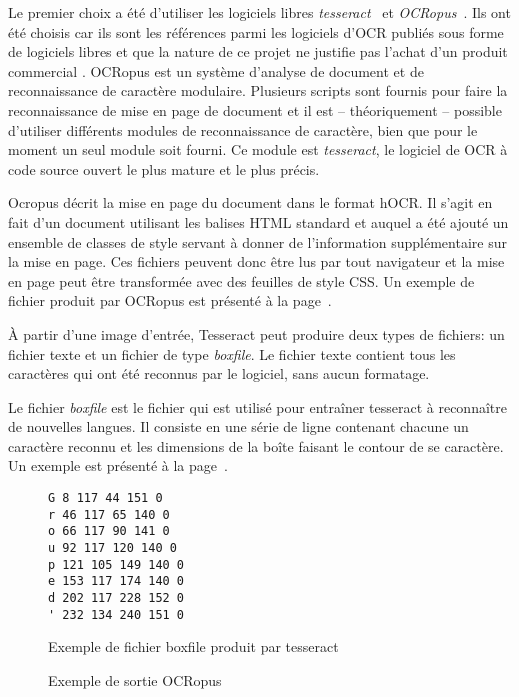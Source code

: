 Le premier choix a été d'utiliser les logiciels libres \emph{tesseract}~\cite{smith2007overview} et \emph{OCRopus}~\cite{breuel2008ocropus}. Ils ont été choisis car ils sont les références parmi les logiciels d'OCR publiés sous forme de logiciels libres et que la nature de ce projet ne justifie pas l'achat d'un produit commercial
.
OCRopus est un système d'analyse de document et de reconnaissance de caractère modulaire. Plusieurs scripts sont fournis pour faire la reconnaissance de mise en page de document et il est -- théoriquement -- possible d'utiliser différents modules de reconnaissance de caractère, bien que pour le moment un seul module soit fourni. Ce module est \emph{tesseract}, le logiciel de OCR à code source ouvert le plus mature et le plus précis. 

Ocropus décrit la mise en page du document dans le format hOCR. Il s'agit en fait d'un document utilisant les balises HTML standard et auquel a été ajouté un ensemble de classes de style servant à donner de l'information supplémentaire sur la mise en page. Ces fichiers peuvent donc être lus par tout navigateur et la mise en page peut être transformée avec des feuilles de style CSS. Un exemple de fichier produit par OCRopus est présenté à la page~\pageref{sortie-ocropus}.

À partir d'une image d'entrée, Tesseract peut produire deux types de fichiers: un fichier texte et un fichier de type \emph{boxfile}. Le fichier texte contient tous les caractères qui ont été reconnus par le logiciel, sans aucun formatage.

Le fichier \emph{boxfile} est le fichier qui est utilisé pour entraîner tesseract à reconnaître de nouvelles langues. Il consiste en une série de ligne contenant chacune un caractère reconnu et les dimensions de la boîte faisant le contour de se caractère. Un exemple est présenté à la page~\pageref{sortie-tesseract}.

\fontsize{3.5mm}{4.5mm}\selectfont
\lstset{language=python}

\begin{figure*}
\begin{lstlisting}
G 8 117 44 151 0
r 46 117 65 140 0
o 66 117 90 141 0
u 92 117 120 140 0
p 121 105 149 140 0
e 153 117 174 140 0
d 202 117 228 152 0
' 232 134 240 151 0
\end{lstlisting}
\label{sortie-tesseract}
\caption{Exemple de fichier boxfile produit par tesseract}
\end{figure*}
\fontsize{4.5mm}{6.5mm}\selectfont
\begin{figure*}
\fontsize{3.5mm}{4.5mm}\selectfont
\lstset{inputencoding=utf8/latin1}

\fontsize{4.5mm}{6.5mm}\selectfont
\caption{Exemple de sortie OCRopus}
\label{sortie-ocropus}
\end{figure*}

